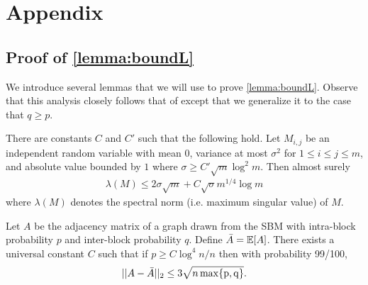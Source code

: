 \appendix
\section{Appendix}

\subsection{Proof of \cref{lemma:boundL}}\label{app:proof}

We introduce several lemmas that we will use to prove
\cref{lemma:boundL}.
Observe that this analysis closely follows that of
\cite{chitra20analyzing} except that we generalize it to
the case that $q\geq p$.

\begin{lemma}\label{lemma:spectral}
    There are constants $C$ and $C'$ such that the following hold.
    Let $M_{i,j}$ be an independent random variable with mean
    0, variance at most $\sigma^2$ for $1 \leq i \leq j \leq m$,
    and absolute value bounded by $1$ where $\sigma \geq C' \sqrt{m} \log^2 m$.
    Then almost surely
    \begin{align}
        \lambda(M) \leq 2 \sigma \sqrt{m}
        + C \sqrt{\sigma} m^{1/4} \log m \nonumber
    \end{align}
    where $\lambda(M)$ denotes the spectral norm
    (i.e. maximum singular value) of $M$.
\end{lemma}

\begin{lemma}\label{lemma:boundA}
    Let $A$ be the adjacency matrix of a graph drawn from the
    SBM with intra-block probability $p$ and inter-block
    probability $q$. Define $\bar{A} = \operatorname*{\mathbb{E}}[A]$.
    There exists a universal constant $C$ such that if
    $p \geq C \log^4 n/n$ then with probability 99/100,
    \begin{align}
        ||A - \bar{A}||_2 \leq 3\sqrt{n \operatorname*{\max \{p, q\}}} \nonumber.
    \end{align}
\end{lemma}

